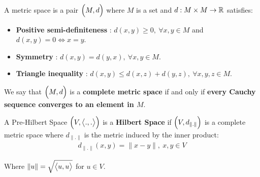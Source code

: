 \begin{definition}
    A metric space is a pair $\Big( M, d \Big)$ where $M$ is a set and $d:M\times M\to \mathbb{R}$ satisfies:
    \begin{itemize}
        \item \textbf{Positive semi-definiteness} : $d(x, y) \ge 0, \ \forall x, y \in M$ and $d(x, y) = 0 \iff x = y$.
        \item \textbf{Symmetry} : $d(x, y) = d(y, x), \ \forall x, y \in M$.
        \item \textbf{Triangle inequality} : $d(x, y) \le d(x, z) + d(y, z), \ \forall x, y, z \in M$.
    \end{itemize}

    \noindent We say that $\Big( M, d \Big)$ is a \textbf{complete metric space} if and only if \textbf{every Cauchy sequence converges to an element in $M$}.
\end{definition}

\begin{definition}
    A Pre-Hilbert Space $\Big( V, \big<.,.\big> \Big)$ is a \textbf{Hilbert Space} if $\Big( V, d_{\|.\|} \Big)$ is a complete metric space where $d_{\|.\|}$ is the metric induced by the inner product:
    \begin{align*}
        d_{\|.\|}(x, y) = \|x - y\|, \ x, y \in V
    \end{align*}

    \noindent Where $\|u\| = \sqrt{\big<u, u\big>}$ for $u\in V$.
\end{definition}